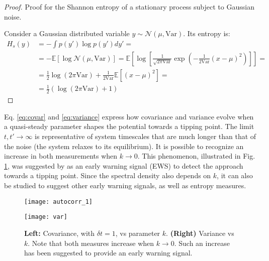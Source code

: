\begin{proof}
	Proof for the Shannon entropy of a stationary process subject to Gaussian noise.
	
	Consider a Gaussian distributed variable $y \sim \mathcal{N}(\mu, \text{Var})$. Its entropy is:
	\begin{align*}
		H_s(y) & = - \int p(y')\log p(y')dy' =  \\
		& = - \mathbb{E}\left[ \log \mathcal{N}(\mu, \text{Var})  \right] =\mathbb{E} \left[ \log \left[ \frac{1}{\sqrt{2 \pi \text{Var}}} \exp \left(-\frac{1}{2 \text{Var}}(x-\mu)^2 \right)  \right]  \right] = \\
		& = \frac{1}{2}\log\left(2\pi\text{Var}\right) + \frac{1}{2\text{Var}}\mathbb{E}\left[(x-\mu)^2\right] = \\
		& = \frac{1}{2}\left( \log (2 \pi \text{Var}) +1 \right)
	\end{align*}
	
\end{proof}

Eq. \ref{eq:covar} and \ref{eq:variance} express how covariance and variance evolve when a quasi-steady parameter shapes the potential towards a tipping point. The limit $t,t' \rightarrow \infty$ is representative of system timescales that are much longer than that of the noise (the system relaxes to its equilibrium). It is possible to recognize an increase in both measurements when $k \to 0$. This phenomenon, illustrated in Fig. \ref{fig:ews_theo}, was suggested by \textcite{scheffer2009early} as an early warning signal (\gls{EWS}) to detect the approach towards a tipping point. Since the spectral density also depends on $k$, it can also be studied to suggest other early warning signals, as well as entropy measures.


\begin{figure}[h]
	\centering
	
	\begin{minipage}[c]{0.47\textwidth}
		\texttt{[image: autocorr\_1]}
		\renewcommand{\figurename}{Fig.}
	\end{minipage}
	\hspace{0.01cm}
	\begin{minipage}[c]{0.47\textwidth}
		\texttt{[image: var]}
		\renewcommand{\figurename}{Fig.}
	\end{minipage} 
	
	\caption{\small \textbf{Left:} Covariance, with $\delta t = 1$, vs parameter $k$. \textbf{(Right)} Variance vs $k$. Note that both measures increase when $k \to 0$. Such an increase has been suggested to provide an early warning signal.}
	\label{fig:ews_theo}
\end{figure}

